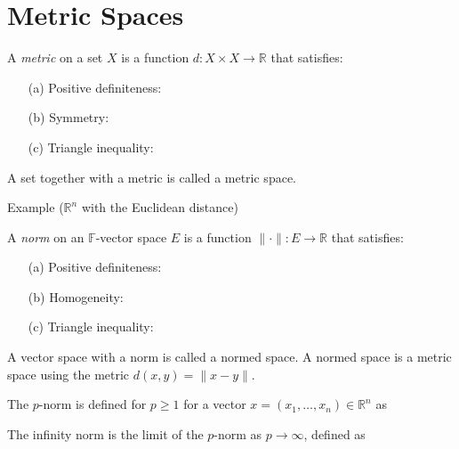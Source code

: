 \documentclass [aspectratio=169]{beamer}
\newcommand{\R}{{\mathbb{R}}}
\newcommand{\F}{{\mathbb{F}}}
\begin{document}
\section{Metric Spaces}

\begin{frame}
\begin{definition}[Metric]
A \emph{metric} on a set $X$ is a function $d:X \times X \to \R$ that satisfies:
\vspace{0.5em}
\begin{enumerate}
 \setlength\itemsep{1em}
    \item[(a)] Positive definiteness: 
    \item[(b)] Symmetry: 
    \item[(c)] Triangle inequality: 
\end{enumerate}
\vspace{0.5em}
A set together with a metric is called a metric space.
\end{definition}
\end{frame}

\begin{frame}
\begin{exampleblock}{Example ($\R^n$ with the Euclidean distance)}
\vspace{4cm}
\end{exampleblock}
\end{frame}


\begin{frame}
\begin{definition}[Norm]
A \emph{norm} on an $\F$-vector space $E$ is a function $\|\cdot\|:E \to \R$ that satisfies:
\vspace{0.5em}
\begin{enumerate}
 \setlength\itemsep{0.5em}
    \item[(a)] Positive definiteness: 
    \item[(b)] Homogeneity: 
    \item[(c)] Triangle inequality: 
\end{enumerate}
\vspace{0.5em}
A vector space with a norm is called a normed space. A normed space is a metric space using the metric $d(x,y) = \| x-y \|$.
\end{definition}

\end{frame}


\begin{frame}
\begin{example}[$p$-norm on $\R^n$]
The $p$-norm is defined for $p \geq 1$ for a vector $x = (x_1, \ldots, x_n) \in \R^n$ as

\vspace{2.5cm}

The infinity norm is the limit of the $p$-norm as $p \to \infty$, defined as
\vspace{2cm}

\end{example}
\end{frame}
\end{document}
